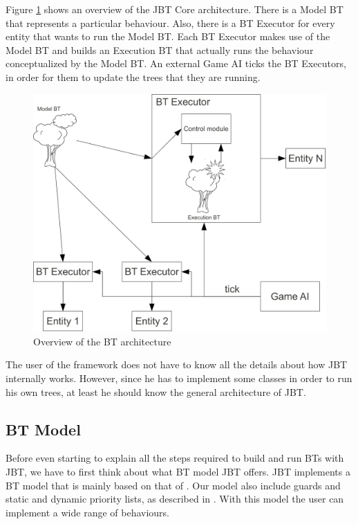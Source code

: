 \documentclass[a4paper]{article}
\begin{document}
Figure \ref{fig:Overview} shows an overview of the JBT Core architecture. There is a Model BT that represents a particular behaviour. Also, there is a BT Executor for every entity that wants to run the Model BT. Each BT Executor makes use of the Model BT and builds an Execution BT that actually runs the behaviour conceptualized by the Model BT. An external Game AI ticks the BT Executors, in order for them to update the trees that they are running.

\begin{figure}
 \centering
 \includegraphics[width=\textwidth]{./Images/Overview.pdf}
 \caption{Overview of the BT architecture}
 \label{fig:Overview}
\end{figure}

The user of the framework does not have to know all the details about how JBT internally works. However, since he has to implement some classes in order to run his own trees, at least he should know the general architecture of JBT.

\subsection{BT Model}\label{sec:BTModel}

Before even starting to explain all the steps required to build and run BTs with JBT, we have to first think about what BT model JBT offers. JBT implements a BT model that is mainly based on that of \cite{Millington09}. Our model also include guards and static and dynamic priority lists, as described in \cite{QueryEnabledBTs}. With this model the user can implement a wide range of behaviours. 
\end{document}

